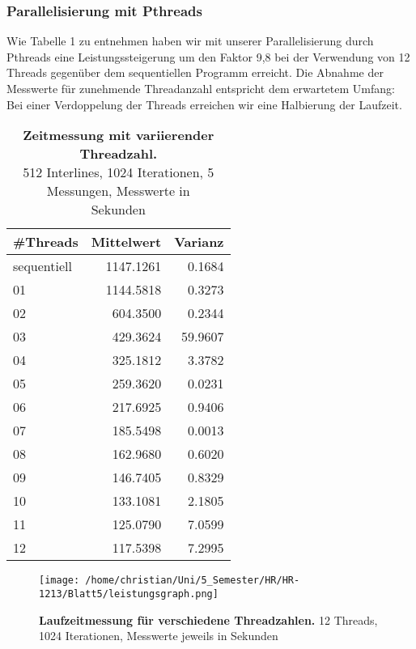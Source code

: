 \documentclass[a4paper,12pt]{scrartcl}
\begin{document}
\parindent0mm
\setcapindent{0pt}
\subsubsection*{Parallelisierung mit Pthreads}
Wie Tabelle 1 zu entnehmen haben wir mit unserer Parallelisierung durch Pthreads eine Leistungssteigerung um den Faktor 9,8 bei der Verwendung von 12 Threads gegenüber dem sequentiellen Programm erreicht. Die Abnahme der Messwerte für zunehmende Threadanzahl entspricht dem erwartetem Umfang: Bei einer Verdoppelung der Threads erreichen wir eine Halbierung der Laufzeit.
\begin{table}[!ht]
\begin{tabular}{|l|r|r|}
\hline
\#Threads&Mittelwert&Varianz \\
\hline
sequentiell&1147.1261 &0.1684\\
\hline
01 &1144.5818 &   0.3273 \\ 
\hline
02 &604.3500   & 0.2344  \\
\hline
03      &    429.3624   & 59.9607  \\
\hline 
04         & 325.1812  &   3.3782   \\
\hline
05       &  259.3620  &  0.0231  \\
\hline
06     &    217.6925  &  0.9406  \\
\hline
07     &     185.5498   &  0.0013  \\      
\hline
08     &    162.9680  &  0.6020  \\
\hline
09     &     146.7405 &   0.8329  \\
\hline
10     &   133.1081   &  2.1805  \\ 
\hline
11     &    125.0790  &   7.0599  \\  
\hline
12    &  117.5398  &   7.2995\\
\hline
\end{tabular}
\caption{\textbf{Zeitmessung mit variierender Threadzahl.}\\ 512 Interlines, 1024 Iterationen, 5 Messungen, Messwerte in\\ Sekunden }
\end{table}

\begin{figure}[H]
\texttt{[image: /home/christian/Uni/5\_Semester/HR/HR-1213/Blatt5/leistungsgraph.png]}
\caption{\textbf{Laufzeitmessung für verschiedene Threadzahlen.} 12 Threads,\\ 1024 Iterationen, Messwerte jeweils in Sekunden}
\end{figure}
\end{document}
